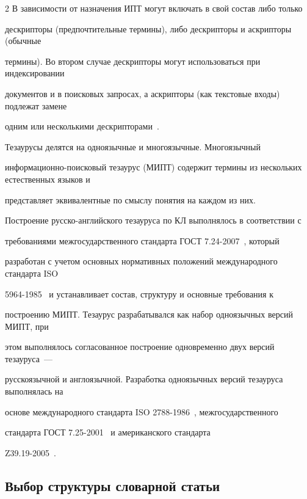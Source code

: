 \begin{multicols}{2}
  В зависимости от назначения ИПТ могут включать в свой состав либо только 

дескрипторы (предпочтительные термины), либо дескрипторы и аскрипторы (обычные 

термины). Во втором случае дескрипторы могут использоваться при индексировании 

документов и в поисковых запросах, а аскрипторы (как текстовые входы) подлежат замене 

одним или несколькими дескрипторами~\cite{17-zag}.

  

  Тезаурусы делятся на одноязычные и многоязычные. Многоязычный 

  ин\-фор\-ма\-ци\-он\-но-по\-иско\-вый тезаурус (МИПТ) содержит термины из нескольких естественных языков и 

представляет эквивалентные по смыслу понятия на каждом из них. 



\columnbreak

  

  Построение русско-английского тезауруса по КЛ выполнялось в соответствии с 

требованиями межгосударственного стандарта ГОСТ 7.24-2007~\cite{11-zag}, который 

разработан с учетом основных нормативных положений международного стандарта ISO 

5964-1985~\cite{12-zag} и устанавливает состав, структуру и основные требования к 

построению МИПТ. Тезаурус разрабатывался как набор одноязычных версий МИПТ, при 

этом выполнялось согласованное построение одновременно двух версий тезауруса~--- 

русскоязычной и англоязычной. Разработка одноязычных версий тезауруса выполнялась на 

основе международного стандарта ISO 2788-1986~\cite{13-zag}, межгосударственного 

стандарта ГОСТ 7.25-2001~\cite{14-zag} и американского стандарта 

  Z39.19-2005~\cite{15-zag}.



\subsection{Выбор структуры словарной статьи}




\end{multicols}
